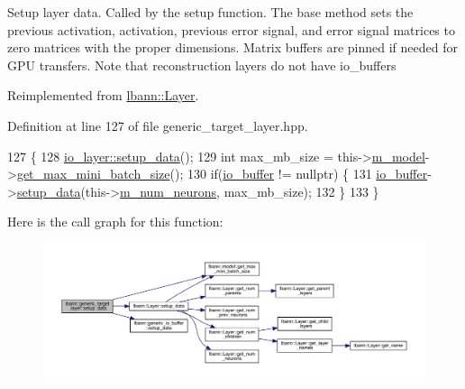 Setup layer data. Called by the setup function. The base method sets the previous activation, activation, previous error signal, and error signal matrices to zero matrices with the proper dimensions. Matrix buffers are pinned if needed for G\+PU transfers. Note that reconstruction layers do not have io\+\_\+buffers 

Reimplemented from \hyperlink{classlbann_1_1Layer_a50a89f8a68762c677d48efe384676e81}{lbann\+::\+Layer}.



Definition at line 127 of file generic\+\_\+target\+\_\+layer.\+hpp.


\begin{DoxyCode}
127                              \{
128     \hyperlink{classlbann_1_1Layer_a50a89f8a68762c677d48efe384676e81}{io\_layer::setup\_data}();
129     \textcolor{keywordtype}{int} max\_mb\_size = this->\hyperlink{classlbann_1_1Layer_a3d9315e99574166f2f33e37b572021d2}{m\_model}->\hyperlink{classlbann_1_1model_a8c311798ff4acaeafdfbf85162ba5084}{get\_max\_mini\_batch\_size}();
130     \textcolor{keywordflow}{if}(\hyperlink{classlbann_1_1generic__target__layer_a8da650b94f50cc63fc90cd792fa50c3f}{io\_buffer} != \textcolor{keyword}{nullptr}) \{  
131       \hyperlink{classlbann_1_1generic__target__layer_a8da650b94f50cc63fc90cd792fa50c3f}{io\_buffer}->\hyperlink{classlbann_1_1generic__io__buffer_a00f3920147f7f19eceb5336bd6ddb421}{setup\_data}(this->\hyperlink{classlbann_1_1Layer_a6b5ebc8a7d9329d8a773ed787e7b41d8}{m\_num\_neurons}, max\_mb\_size);
132     \}
133   \}
\end{DoxyCode}
Here is the call graph for this function\+:\nopagebreak
\begin{figure}[H]
\begin{center}
\leavevmode
\includegraphics[width=350pt]{classlbann_1_1generic__target__layer_a73b35ee4dcb97a166369426d975596b2_cgraph}
\end{center}
\end{figure}
\mbox{\label{classlbann_1_1generic__target__layer_a3a970c1b23f7367276f7061563fc8b65}} 
